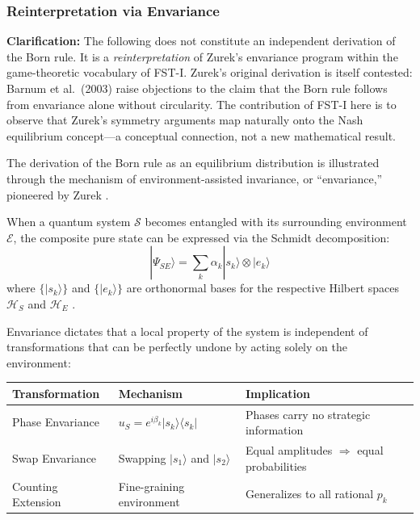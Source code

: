\documentclass[12pt,a4paper]{article}
\theoremstyle{remark}
\begin{document}
\subsubsection{Reinterpretation via Envariance}

\textbf{Clarification:} The following does not constitute an independent derivation of the Born rule. It is a \emph{reinterpretation} of Zurek's envariance program \citep{Zurek2003,Zurek2005} within the game-theoretic vocabulary of FST-I. Zurek's original derivation is itself contested: Barnum et al.\ (2003) \citep{ZurekDerivation2003} raise objections to the claim that the Born rule follows from envariance alone without circularity. The contribution of FST-I here is to observe that Zurek's symmetry arguments map naturally onto the Nash equilibrium concept---a conceptual connection, not a new mathematical result.

The derivation of the Born rule as an equilibrium distribution is illustrated through the mechanism of environment-assisted invariance, or ``envariance,'' pioneered by Zurek \citep{Zurek2003,Zurek2005}.

When a quantum system $\mathcal{S}$ becomes entangled with its surrounding environment $\mathcal{E}$, the composite pure state can be expressed via the Schmidt decomposition:
\begin{equation}
|\Psi_{SE}\rangle = \sum_k \alpha_k |s_k\rangle \otimes |e_k\rangle
\end{equation}
where $\{|s_k\rangle\}$ and $\{|e_k\rangle\}$ are orthonormal bases for the respective Hilbert spaces $\mathcal{H}_S$ and $\mathcal{H}_E$ \citep{ZurekDerivation2003}.

Envariance dictates that a local property of the system is independent of transformations that can be perfectly undone by acting solely on the environment:

\begin{center}
\begin{tabular}{lll}
\toprule
\textbf{Transformation} & \textbf{Mechanism} & \textbf{Implication} \\
\midrule
Phase Envariance & $u_S = e^{i\beta_k}|s_k\rangle\langle s_k|$ & Phases carry no strategic information \\
Swap Envariance & Swapping $|s_1\rangle$ and $|s_2\rangle$ & Equal amplitudes $\Rightarrow$ equal probabilities \\
Counting Extension & Fine-graining environment & Generalizes to all rational $p_k$ \\
\bottomrule
\end{tabular}
\end{center}
\end{document}

